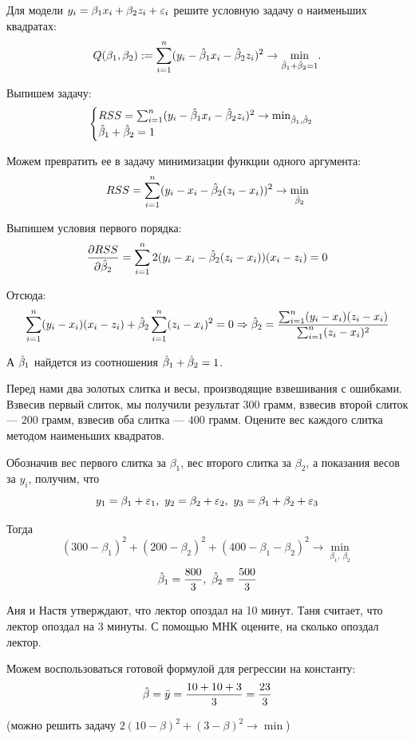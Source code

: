 \begin{problem}
Для модели $y_i = \beta_1 x_i + \beta_2 z_i + \varepsilon_i$ решите условную задачу о наименьших квадратах:
\[
Q(\beta_1, \beta_2) := \sum_{i=1}^n (y_i - \hat{\beta}_1 x_i - \hat{\beta}_2 z_i)^2 \to \underset{\hat{\beta}_1 + \hat{\beta}_2 = 1}{\min}.
\]


\begin{sol}
Выпишем задачу:
\[
\begin{cases}
RSS = \sum_{i=1}^{n}(y_i - \hat{\beta}_1x_i - \hat{\beta}_2z_i)^2 \to \min_{\hat{\beta}_1, \hat{\beta}_2}\\
\hat{\beta}_1 + \hat{\beta}_2 = 1
\end{cases}
\]

Можем превратить ее в задачу минимизации функции одного аргумента:
\[
RSS =  \sum_{i=1}^{n}(y_i - x_i - \hat{\beta}_2(z_i-x_i))^2 \to \min_{\hat{\beta}_2}
\]

Выпишем условия первого порядка:
\[
\frac{\partial RSS}{\partial \hat{\beta}_2} = \sum_{i=1}^{n}2(y_i-x_i-\hat{\beta}_2(z_i-x_i))(x_i-z_i)=0
\]

Отсюда:
\[
\sum_{i=1}^{n}(y_i-x_i)(x_i-z_i) + \hat{\beta}_2\sum_{i=1}^{n}(z_i-x_i)^2 = 0 \Rightarrow \hat{\beta}_2 = \frac{\sum_{i=1}^n (y_i-x_i)(z_i-x_i)}{\sum_{i=1}^n (z_i-x_i)^2}
\]

А $\hat{\beta}_1$ найдется из соотношения $\hat{\beta}_1+\hat{\beta}_2 = 1$.

\end{sol}
\end{problem}

\begin{problem}
Перед нами два золотых слитка и весы, производящие взвешивания с ошибками. Взвесив первый слиток, мы получили результат $300$ грамм, взвесив второй слиток — $200$ грамм, взвесив оба слитка — $400$ грамм. Оцените вес каждого слитка методом наименьших квадратов.

\begin{sol}
Обозначив вес первого слитка за \(\beta_1\), вес второго слитка за \(\beta_2\), а показания весов за \(y_i\), получим, что
\[y_1 = \beta_1 + \varepsilon_1, \ y_2 = \beta_2 + \varepsilon_2, \ y_3 = \beta_1 + \beta_2 + \varepsilon_3\]

Тогда
\[(300 - \beta_1)^2 + (200 - \beta_2)^2 + (400 - \beta_1 - \beta_2)^2 \to \min _{\beta_1,\  \beta_2} \]
\[\hat{\beta}_1 = \frac{800}{3}, \ \hat{\beta}_2 = \frac{500}{3} \]
\end{sol}
\end{problem}


\begin{problem}
Аня и Настя утверждают, что лектор опоздал на 10 минут. 
Таня считает, что лектор опоздал на 3 минуты. 
С помощью МНК оцените, на сколько опоздал лектор.

\begin{sol}
Можем воспользоваться готовой формулой для регрессии на константу:
\[
\hat{\beta} = \bar{y} = \frac{10+10+3}{3} = \frac{23}{3}
\]

(можно решить задачу $2(10-\beta)^2 + (3-\beta)^2\to \min$)

\end{sol}
\end{problem}

